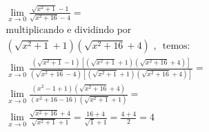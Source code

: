 \begin{ex}
\begin{align}
&\lim_{x\rightarrow 0} \frac{\sqrt{x^2+1}-1}{\sqrt{x^2+16}-4}=\nonumber\\
&\text{multiplicando e dividindo por}\nonumber\\
&(\sqrt{x^2+1}+1)(\sqrt{x^2+16}+4)\text{ , }\text{ temos: }\nonumber\\
&\lim_{x\rightarrow 0} \frac{(\sqrt{x^2+1}-1)[(\sqrt{x^2+1}+1)(\sqrt{x^2+16}+4)]}{(\sqrt{x^2+16}-4)[(\sqrt{x^2+1}+1)(\sqrt{x^2+16}+4)]}=\nonumber\\
&\lim_{x\rightarrow 0} \frac{(x^2-1+1)(\sqrt{x^2+16}+4)}{(x^2+16-16)(\sqrt{x^2+1}+1)}=\nonumber\\
&\lim_{x\rightarrow 0} \frac{\sqrt{x^2+16}+4}{\sqrt{x^2+1}+1}=\frac{16+4}{\sqrt{1}+1}=\frac{4+4}{2}=4\nonumber
\end{align}
\end{ex}